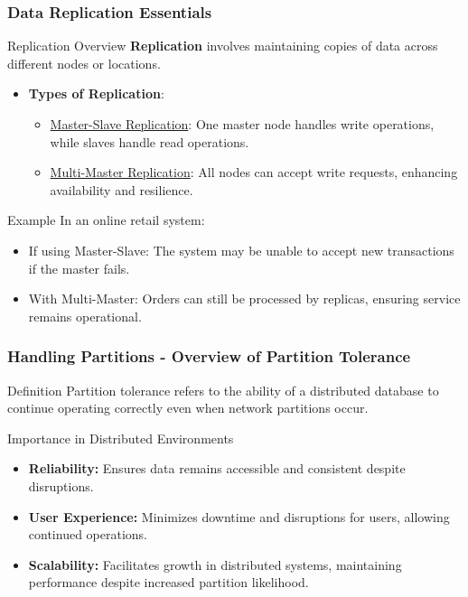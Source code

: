 \documentclass[aspectratio=169]{beamer}
\begin{document}
\begin{frame}[fragile]
    \frametitle{Data Replication Essentials}
    \begin{block}{Replication Overview}
        \textbf{Replication} involves maintaining copies of data across different nodes or locations.
    \end{block}
    \begin{itemize}
        \item \textbf{Types of Replication}:
            \begin{itemize}
                \item \underline{Master-Slave Replication}: One master node handles write operations, while slaves handle read operations.
                \item \underline{Multi-Master Replication}: All nodes can accept write requests, enhancing availability and resilience.
            \end{itemize}
    \end{itemize}
    \begin{block}{Example}
        In an online retail system:
        \begin{itemize}
            \item If using Master-Slave: The system may be unable to accept new transactions if the master fails.
            \item With Multi-Master: Orders can still be processed by replicas, ensuring service remains operational.
        \end{itemize}
    \end{block}
\end{frame}

\begin{frame}[fragile]
    \frametitle{Handling Partitions - Overview of Partition Tolerance}
    
    \begin{block}{Definition}
        Partition tolerance refers to the ability of a distributed database to continue operating correctly even when network partitions occur.
    \end{block}
    
    \begin{block}{Importance in Distributed Environments}
        \begin{itemize}
            \item \textbf{Reliability:} Ensures data remains accessible and consistent despite disruptions.
            \item \textbf{User Experience:} Minimizes downtime and disruptions for users, allowing continued operations.
            \item \textbf{Scalability:} Facilitates growth in distributed systems, maintaining performance despite increased partition likelihood.
        \end{itemize}
    \end{block}
\end{frame}
\end{document}
